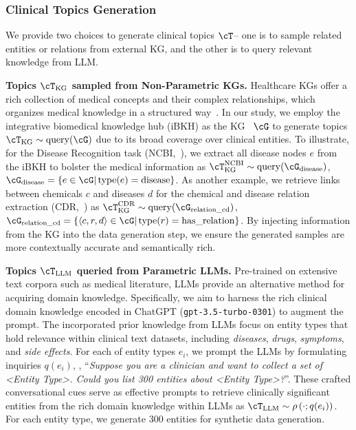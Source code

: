 \subsubsection{Clinical Topics Generation}
We provide two choices to generate clinical topics $\cT$-- one is to sample related entities or relations from external KG, and the other is to query relevant knowledge from LLM.

\noindent \textbf{Topics $\cT_{\operatorname{KG}}$ sampled from Non-Parametric KGs.} 
Healthcare KGs offer 
a rich collection of medical concepts and their complex relationships, 
which organizes medical knowledge in a structured way~\citep{li2022graph}. 
In our study, we employ the integrative biomedical knowledge hub (iBKH) as the KG~\citep{su2023biomedical} $\cG$ to generate topics $\cT_{\operatorname{KG}} \sim \operatorname{query}(\cG)$
due to its broad coverage over clinical entities. 
To illustrate, for the Disease Recognition task (NCBI,~\citet{ncbi-disease}), we extract all disease nodes $e$ from the iBKH to bolster the medical information as 
$\cT_{\operatorname{KG}}^{\operatorname{NCBI}}\sim \operatorname{query}(\cG_{\operatorname{disease}})$, 
$\cG_{\operatorname{disease}}=\{e\in \cG|\operatorname{type}(e)=\operatorname{disease}\}$.
As another example, we retrieve links between chemicals  $c$ and diseases $d$  for the chemical and disease relation extraction (CDR,~\citet{cdr_dataset}) as
$\cT_{\operatorname{KG}}^{\operatorname{CDR}}\sim \operatorname{query}(\cG_{\operatorname{relation\_{cd}}})$, 
$\cG_{\operatorname{relation\_{cd}}}=\{\langle c,r,d \rangle\in \cG|\operatorname{type}(r)=\operatorname{has\_{relation}}\}$. 
By injecting information from the KG into the data generation step, we ensure the generated samples are more contextually accurate and semantically rich.

\noindent \textbf{Topics $\cT_{\operatorname{LLM}}$ queried from Parametric LLMs.} 
Pre-trained on extensive text corpora such as medical literature, LLMs provide an alternative method for acquiring domain knowledge.
Specifically, we aim to harness the rich clinical domain knowledge encoded in ChatGPT (\texttt{gpt-3.5-turbo-0301}) to augment the prompt. 
The incorporated prior knowledge from LLMs focus on entity types that hold relevance within clinical text datasets, including \emph{diseases}, \emph{drugs}, \emph{symptoms}, and \emph{side effects}.
For each of entity types $e_i$, we prompt the LLMs by formulating inquiries $q(e_i)$, \eg, ``\emph{Suppose you are a clinician and want to collect a set of <Entity Type>. Could you list 300 entities about <Entity Type>?}''. These crafted conversational cues serve as effective prompts to retrieve clinically significant entities from the rich domain knowledge within LLMs as 
$\cT_{\operatorname{LLM}} \sim \rho\left(\cdot;q(e_i)\right)$. 
For each entity type, we generate 300 entities for synthetic data generation.

